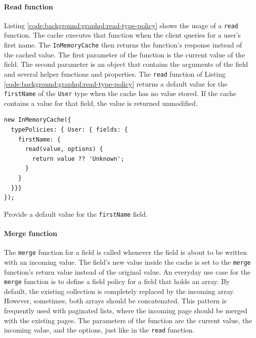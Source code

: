 \paragraph{Read function}

Listing \ref{code:background:graphql:read-type-policy} shows the usage of a \texttt{read} function. The cache executes that function when the client queries for a user's first name. The \texttt{InMemoryCache} then returns the function's response instead of the cached value. The first parameter of the function is the current value of the field. The second parameter is an object that contains the arguments of the field and several helper functions and properties. \cite{misc:-:background:graphql:apollo-client-cache-reading-writing} The \texttt{read} function of Listing \ref{code:background:graphql:read-type-policy} returns a default value for the \texttt{firstName} of the \texttt{User} type when the cache has no value stored. If the cache contains a value for that field, the value is returned unmodified.

\ifshowListings
\begin{listing}[H]
    \begin{verbatim}
new InMemoryCache({
  typePolicies: { User: { fields: {
    firstName: {
      read(value, options) {
        return value ?? 'Unknown';
      }
    }
  }}}
});
    \end{verbatim}
    \caption{Provide a default value for the \texttt{firstName} field.}\label{code:background:graphql:read-type-policy}
\end{listing}
\fi

\paragraph{Merge function}

The \texttt{merge} function for a field is called whenever the field is about to be written with an incoming value. The field's new value inside the cache is set to the \texttt{merge} function's return value instead of the original value. An everyday use case for the \texttt{merge} function is to define a field policy for a field that holds an array. By default, the existing collection is completely replaced by the incoming array. However, sometimes, both arrays should be concatenated. This pattern is frequently used with paginated lists, where the incoming page should be merged with the existing pages. The parameters of the function are the current value, the incoming value, and the options, just like in the \texttt{read} function. \cite{misc:-:background:graphql:apollo-client-cache-reading-writing}

